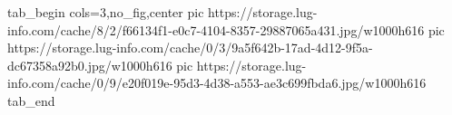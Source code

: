  
 
 
 
 


\ifcmt
  tab_begin cols=3,no_fig,center
     pic https://storage.lug-info.com/cache/8/2/f66134f1-e0c7-4104-8357-29887065a431.jpg/w1000h616%
		 pic https://storage.lug-info.com/cache/0/3/9a5f642b-17ad-4d12-9f5a-dc67358a92b0.jpg/w1000h616%
		 pic https://storage.lug-info.com/cache/0/9/e20f019e-95d3-4d38-a553-ae3c699fbda6.jpg/w1000h616%
  tab_end
\fi
